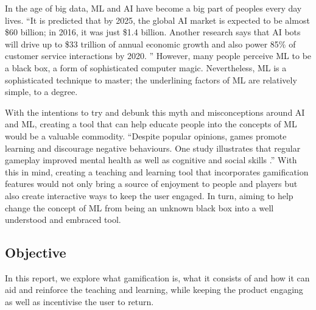 		In the age of big data, \ac{ML} and \ac{AI} have become a big part of peoples every day lives. “It is predicted that by 2025, the global \ac{AI} market is expected to be almost \$60 billion; in 2016, it was just \$1.4 billion. Another research says that AI bots will drive up to \$33 trillion of annual economic growth and also power 85\% of customer service interactions by 2020. \cite{hackernoon}” However, many people perceive \ac{ML} to be a black box, a form of sophisticated computer magic. Nevertheless, \ac{ML} is a sophisticated technique to master; the underlining factors of \ac{ML} are relatively simple, to a degree.
		
		With the intentions to try and debunk this myth and misconceptions around \ac{AI} and \ac{ML}, creating a tool that can help educate people into the concepts of \ac{ML} would be a valuable commodity. “Despite popular opinions, games promote learning and discourage negative behaviours. One study illustrates that regular gameplay improved mental health as well as cognitive and social skills \cite{classcraft}.” With this in mind, creating a teaching and learning tool that incorporates gamification features would not only bring a source of enjoyment to people and players but also create interactive ways to keep the user engaged. In turn, aiming to help change the concept of \ac{ML} from being an unknown black box into a well understood and embraced tool.
	
	\subsection{Objective}
		\label{sec:intro_objective} 
		
		In this report, we explore what gamification is, what it consists of and how it can aid and reinforce the teaching and learning, while keeping the product engaging as well as incentivise the user to return.
		
%		
	
